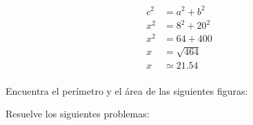 \documentclass[12pt,addpoints,answers]{evalua}
\begin{document}
\begin{questions}
\begin{multicols}{2}
\begin{parts}
            \begin{solutionbox}{4cm}
                \begin{align*}
                    c^2 & = a^2 + b^2  \\
                    x^2 & = 8^2 + 20^2 \\
                    x^2 & = 64 + 400   \\
                    x   & = \sqrt{464} \\
                    x   & \simeq 21.54 \\
                \end{align*}
            \end{solutionbox}
        \end{parts}
    \end{multicols}

    \question[] Encuentra el perímetro y el área de las siguientes figuras:

    \begin{multicols}{2}
    \end{multicols}

    \question[] Resuelve los siguientes problemas:

    \begin{multicols}{2}
\end{multicols}
\end{questions}
\end{document}
